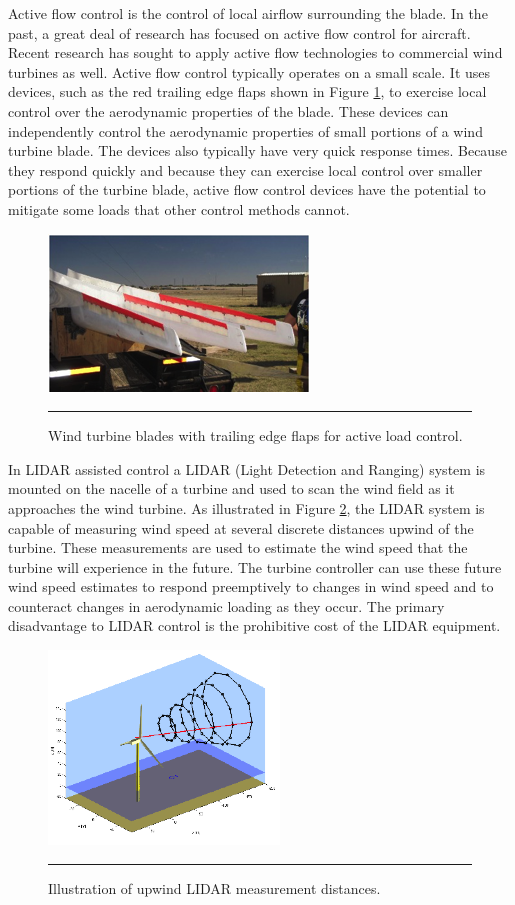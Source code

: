 Active flow control is the control of local airflow surrounding the blade.  In the past, a great deal of research has focused on active flow control for aircraft. Recent research has sought to apply active flow technologies to commercial wind turbines as well. Active flow control typically operates on a small scale.  It uses devices, such as the red trailing edge flaps shown in Figure \ref{fig1-4}, to exercise local control over the aerodynamic properties of the blade.  These devices can independently control the aerodynamic properties of small portions of a wind turbine blade.  The devices also typically have very quick response times.  Because they respond quickly and because they can exercise local control over smaller portions of the turbine blade, active flow control devices have the potential to mitigate some loads that other control methods cannot.  



\begin{figure}[htbp]
	\centering
		\includegraphics{Figures/ch1Figures/fig1-4.png}
		\rule{35em}{0.5pt}
	\caption{Wind turbine blades with trailing edge flaps for active load control.\cite{berg2012}}
	\label{fig1-4}
\end{figure}

In LIDAR assisted control a LIDAR (Light Detection and Ranging) system is mounted on the nacelle of a turbine and used to scan the wind field as it approaches the wind turbine.  As illustrated in Figure \ref{fig1-5}, the LIDAR system is capable of measuring wind speed at several discrete distances upwind of the turbine.  These measurements are used to estimate the wind speed that the turbine will experience in the future.  The turbine controller can use these future wind speed estimates to respond preemptively to changes in wind speed and to counteract changes in aerodynamic loading as they occur. The primary disadvantage to LIDAR control is the prohibitive cost of the LIDAR equipment.  

\begin{figure}[htbp]
	\centering
		\includegraphics{Figures/ch1Figures/fig1-5.png}
		\rule{35em}{0.5pt}
	\caption{Illustration of upwind LIDAR measurement distances.\cite{schlipf2011}}
	\label{fig1-5}
\end{figure}

